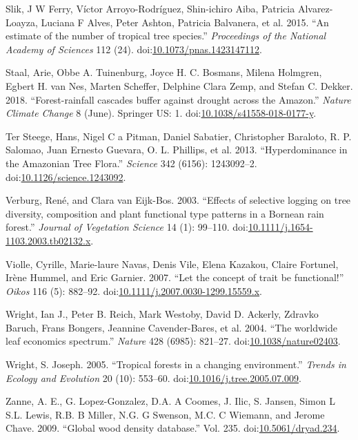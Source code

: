 \documentclass[]{elsarticle} %
\begin{document}
\hypertarget{ref-Slik2015}{}
Slik, J W Ferry, Víctor Arroyo-Rodríguez, Shin-ichiro Aiba, Patricia
Alvarez-Loayza, Luciana F Alves, Peter Ashton, Patricia Balvanera, et
al. 2015. ``An estimate of the number of tropical tree species.''
\emph{Proceedings of the National Academy of Sciences} 112 (24).
doi:\href{https://doi.org/10.1073/pnas.1423147112}{10.1073/pnas.1423147112}.

\hypertarget{ref-Staal2018}{}
Staal, Arie, Obbe A. Tuinenburg, Joyce H. C. Bosmans, Milena Holmgren,
Egbert H. van Nes, Marten Scheffer, Delphine Clara Zemp, and Stefan C.
Dekker. 2018. ``Forest-rainfall cascades buffer against drought across
the Amazon.'' \emph{Nature Climate Change} 8 (June). Springer US: 1.
doi:\href{https://doi.org/10.1038/s41558-018-0177-y}{10.1038/s41558-018-0177-y}.

\hypertarget{ref-TerSteege2013}{}
Ter Steege, Hans, Nigel C a Pitman, Daniel Sabatier, Christopher
Baraloto, R. P. Salomao, Juan Ernesto Guevara, O. L. Phillips, et al.
2013. ``Hyperdominance in the Amazonian Tree Flora.'' \emph{Science} 342
(6156): 1243092--2.
doi:\href{https://doi.org/10.1126/science.1243092}{10.1126/science.1243092}.

\hypertarget{ref-Verburg2003}{}
Verburg, René, and Clara van Eijk-Bos. 2003. ``Effects of selective
logging on tree diversity, composition and plant functional type
patterns in a Bornean rain forest.'' \emph{Journal of Vegetation
Science} 14 (1): 99--110.
doi:\href{https://doi.org/10.1111/j.1654-1103.2003.tb02132.x}{10.1111/j.1654-1103.2003.tb02132.x}.

\hypertarget{ref-Violle2007}{}
Violle, Cyrille, Marie-laure Navas, Denis Vile, Elena Kazakou, Claire
Fortunel, Irène Hummel, and Eric Garnier. 2007. ``Let the concept of
trait be functional!'' \emph{Oikos} 116 (5): 882--92.
doi:\href{https://doi.org/10.1111/j.2007.0030-1299.15559.x}{10.1111/j.2007.0030-1299.15559.x}.

\hypertarget{ref-Wright2004}{}
Wright, Ian J., Peter B. Reich, Mark Westoby, David D. Ackerly, Zdravko
Baruch, Frans Bongers, Jeannine Cavender-Bares, et al. 2004. ``The
worldwide leaf economics spectrum.'' \emph{Nature} 428 (6985): 821--27.
doi:\href{https://doi.org/10.1038/nature02403}{10.1038/nature02403}.

\hypertarget{ref-Wright2005}{}
Wright, S. Joseph. 2005. ``Tropical forests in a changing environment.''
\emph{Trends in Ecology and Evolution} 20 (10): 553--60.
doi:\href{https://doi.org/10.1016/j.tree.2005.07.009}{10.1016/j.tree.2005.07.009}.

\hypertarget{ref-Zanne2009}{}
Zanne, A. E., G. Lopez-Gonzalez, D.A. A Coomes, J. Ilic, S. Jansen,
Simon L S.L. Lewis, R.B. B Miller, N.G. G Swenson, M.C. C Wiemann, and
Jerome Chave. 2009. ``Global wood density database.'' Vol. 235.
doi:\href{https://doi.org/10.5061/dryad.234}{10.5061/dryad.234}.
\end{document}
